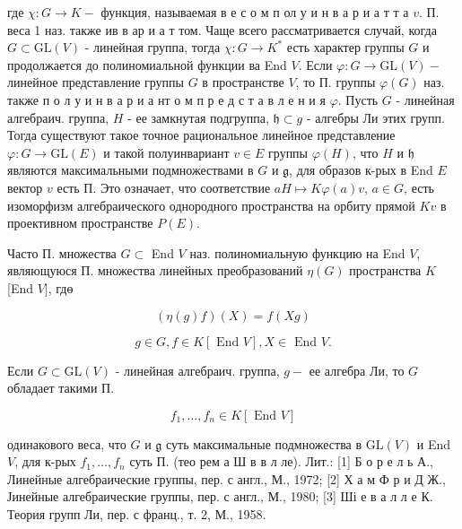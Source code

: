 \documentclass[10pt]{article}
\begin{document}
где $\chi: G \rightarrow K-$ функция, называемая в е с о м п ол у и н в а р и а т т а $v$. П. веса 1 наз. также ив в ар и а т том. Чаще всего рассматривается случай, когда $G \subset \mathrm{GL}(V)$ - линейная группа, тогда $\chi: G \rightarrow K^{*}$ есть характер группы $G$ и продолжается до полиномиальной функции ва End $V$. Если $\varphi: G \rightarrow \mathrm{GL}(V)-$ линейное представление группы $G$ в пространстве $V$, то П. группы $\varphi(G)$ наз. также п о л у и н в а р и а нт о м п р е д с т а в л е н и я $\varphi$. Пусть $G$ - линейная алгебраич. группа, $H$ - ее замкнутая подгруппа, $\mathfrak{h} \subset g$ - алгебры Ли этих групп. Тогда существуют такое точное рациональное линейное представление $\varphi: G \rightarrow \mathrm{GL}(E)$ и такой полуинвариант $v \in E$ группы $\varphi(H)$, что $H$ и $\mathfrak{h}$ являются максимальными подмножествами в $G$ и $\mathfrak{g}$, для образов к-рых в End $E$ вектор $v$ есть П. Это означает, что соответствие $a H \mapsto K \varphi(a) v$, $a \in G$, есть изоморфизм алгебраического однородного пространства на орбиту прямой $K v$ в проективном пространстве $P(E)$.



Часто П. множества $G \subset$ End $V$ наз. полиномиальную функцию на End $V$, являющуюся П. множества линейных преобразований $\eta(G)$ пространства $K$ [End $V]$, гдө



\[

(\eta(g) f)(X)=f(X g)

\]



\[

g \in G, f \in K[\text { End } V], X \in \text { End } V .

\]



Если $G \subset \mathrm{GL}(V)$ - линейная алгебраич. группа, $g-$ ее алгебра Ли, то $G$ обладает такими П.



\[

f_{1}, \ldots, f_{n} \in K[\text { End } V]

\]



одинакового веса, что $G$ и $\mathfrak{g}$ суть максимальные подмножества в $\mathrm{GL}(V)$ и End $V$, для к-рых $f_{1}, \ldots, f_{n}$ суть П. (тео рем а Ш в в л ле). Лит.: [1] Б о р е л ь А., Линейные алгебраические группы, пер. с англ., М., 1972; [2] Х а м Ф р и Д Ж., Јинейные алгебраические группы, пер. с англ., М., 1980; [3] Ші е в а л л е К. Теория групп Ли, пер. с франц., т. 2, М., 1958.
\end{document}
